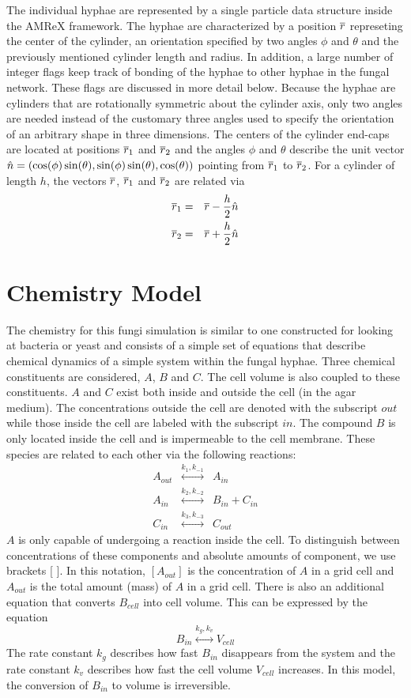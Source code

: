 \documentclass[12pt]{article}
\begin{document}
The individual hyphae are represented by a single particle data structure inside
the AMReX framework. The hyphae are characterized by a position $\overline{r}$
represeting the center of the cylinder, an orientation
specified by two angles $\phi$ and $\theta$ and the previously mentioned cylinder
length and radius. In addition, a large number of integer flags keep track of
bonding of the hyphae to other hyphae in the fungal network. These flags are
discussed in more detail below. Because the hyphae are cylinders that are rotationally
symmetric about the cylinder axis, only two angles are needed instead of the
customary three angles used to specify the orientation of an arbitrary shape
in three dimensions. The centers of the cylinder end-caps are located at positions
$\overline{r}_1$ and $\overline{r}_2$ and the angles $\phi$ and $\theta$ describe the unit vector
$\hat{n} = (\cos(\phi)\sin(\theta),\sin(\phi)\sin(\theta),\cos(\theta))$ pointing
from $\overline{r}_1$ to $\overline{r}_2$. For a cylinder of length $h$, the vectors $\overline{r}$,
$\overline{r}_1$ and $\overline{r}_2$ are related via
\begin{eqnarray*}
\overline{r}_1 & = & \overline{r} - \frac{h}{2}\hat{n} \\
\overline{r}_2 & = & \overline{r} + \frac{h}{2}\hat{n}
\end{eqnarray*}

\section{Chemistry Model}
The chemistry for this fungi simulation is similar to one constructed for looking
at bacteria or yeast and consists of a simple set
of equations that describe chemical dynamics of a simple system within
the fungal hyphae. Three chemical
constituents are considered, $A$, $B$
and $C$. The cell volume is also coupled to these constituents. $A$ and $C$
exist both inside and outside the cell (in the
agar medium). The concentrations outside the cell are denoted with the
subscript $out$ while those inside the cell are labeled
with the subscript $in$. The compound $B$ is only located inside the cell and
is impermeable to the cell membrane.
These species are related to each other via the following reactions:
\begin{eqnarray*}
A_{out} &\stackrel{k_{1},k_{-1}}{\longleftrightarrow}& A_{in} \\
A_{in} &\stackrel{k_2,k_{-2}}{\longleftrightarrow}& B_{in} + C_{in} \\
C_{in} &\stackrel{k_3,k_{-3}}{\longleftrightarrow}& C_{out}
\end{eqnarray*}
$A$ is only capable of undergoing a reaction inside the cell.  To distinguish
between concentrations of these components and absolute amounts of component, we use
brackets [ ]. In this notation, $[A_{out}]$ is the concentration of $A$ in a grid cell and
$A_{out}$ is the total amount (mass) of $A$ in a grid cell. There is also an
additional equation that converts $B_{cell}$ into cell volume. This can be
expressed by the equation
\[
B_{in} \stackrel{k_g,k_v}{\longleftrightarrow} V_{cell}
\]
The rate constant $k_g$ describes how fast $B_{in}$ disappears from the system
and the rate constant $k_v$ describes how fast the cell volume $V_{cell}$
increases. In this model, the conversion of $B_{in}$ to volume is irreversible.
\end{document}
